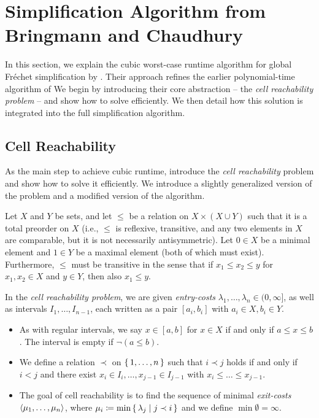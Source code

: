 \section{Simplification Algorithm from Bringmann and Chaudhury}
\label{sec:cubic_algo}
In this section, we explain the cubic worst-case runtime algorithm for global Fréchet simplification by \citeauthor{polyline_simplification_has_cubic_complexity_bringmannetal}. Their approach refines the earlier polynomial-time algorithm of \citeauthor{on_optimal_polyline_simplification_using_the_hausdorff_and_frechet_distance} We begin by introducing their core abstraction -- the \emph{cell reachability problem} -- and show how to solve efficiently. We then detail how this solution is integrated into the full simplification algorithm.

\subsection{Cell Reachability}
\label{ssec:cell_reachability}
As the main step to achieve cubic runtime, \citeauthor{polyline_simplification_has_cubic_complexity_bringmannetal} introduce the \emph{cell reachability} problem and show how to solve it efficiently. We introduce a slightly generalized version of the problem and a modified version of the algorithm. 

\begin{definition}
	Let \(X\) and \(Y\) be sets, and let \(\leq\) be a relation on \(X \times (X \cup Y)\) such that it is a total preorder on \(X\) (i.e., \(\leq\) is reflexive, transitive, and any two elements in \(X\) are comparable, but it is not necessarily antisymmetric). Let \(0 \in X\) be a minimal element and \(1 \in Y\) be a maximal element (both of which must exist). Furthermore, \(\leq\) must be transitive in the sense that if \(x_1 \leq x_2 \leq y\) for \(x_1, x_2 \in X\) and \(y \in Y\), then also \(x_1 \leq y\).

	In the \emph{cell reachability problem}, we are given \emph{entry-costs} \(\lambda_1, \dots, \lambda_n \in (0, \infty]\), as well as intervals \(I_1, \dots, I_{n-1}\), each written as a pair \([a_i, b_i]\) with \(a_i \in X, b_i \in Y\).

	\begin{itemize}
		\item As with regular intervals, we say \(x \in [a, b]\) for \(x \in X\) if and only if \(a \leq x \leq b\). The interval is empty if \(\lnot (a \leq b)\).

		\item We define a relation \(\prec\) on \(\set{1, \dots, n}\) such that \(i \prec j\) holds if and only if \(i < j\) and there exist \(x_i \in I_i, \dots, x_{j-1} \in I_{j-1}\) with \(x_i \leq \dots \leq x_{j - 1}\).

		\item The goal of cell reachability is to find the sequence of minimal \emph{exit-costs} \(\left\langle\mu_1, \dots, \mu_n\right\rangle\), where \(\mu_i \coloneq \min \set{ \lambda_j \mid j \prec i}\) and we define \(\min \emptyset = \infty\).
	\end{itemize}
\end{definition}


